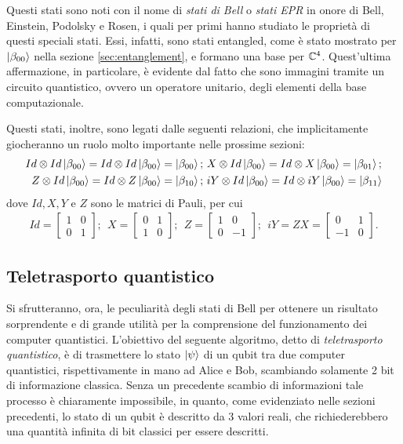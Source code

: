 Questi stati sono noti con il nome di \textit{stati di Bell} o \textit{stati EPR} in onore di Bell, Einstein, Podolsky e Rosen, i quali per primi hanno studiato le proprietà di questi speciali stati.
Essi, infatti, sono stati entangled, come è stato mostrato per $\ket{\beta_{00}}$ nella sezione \ref{sec:entanglement}, e formano una base per $\mathbb{C}^{4}$.
Quest'ultima affermazione, in particolare, è evidente dal fatto che sono immagini tramite un circuito quantistico, ovvero un operatore unitario, degli elementi della base computazionale.

Questi stati, inoltre, sono legati dalle seguenti relazioni, che implicitamente giocheranno un ruolo molto importante nelle prossime sezioni:
\begin{align}\label{eqn:Bell_identities}
 Id \otimes Id \ket{\beta_{00}} = Id \otimes Id \ket{\beta_{00}} = \ket{\beta_{00}};&\
 X \otimes Id \ket{\beta_{00}} = Id \otimes X \ket{\beta_{00}} = \ket{\beta_{01}};\\
 Z \otimes Id \ket{\beta_{00}} = Id \otimes Z \ket{\beta_{00}} = \ket{\beta_{10}};&\
 iY \otimes Id \ket{\beta_{00}} = Id \otimes iY \ket{\beta_{00}} = \ket{\beta_{11}}
\end{align}
dove $Id, X, Y$ e $Z$ sono le matrici di Pauli, per cui
\begin{align}
 Id  = 
 \begin{bmatrix}
  1 & 0\\
  0 & 1
 \end{bmatrix};\ \
 X  = 
 \begin{bmatrix}
  0 & 1\\
  1 & 0
 \end{bmatrix};\ \
 Z = 
 \begin{bmatrix}
  1 & 0\\
  0 & -1
 \end{bmatrix};\ \
 iY = ZX = 
 \begin{bmatrix}
  0 & 1\\
  -1 & 0
 \end{bmatrix}.
\end{align}


\subsection{Teletrasporto quantistico}\label{sec:QTeleportation}
Si sfrutteranno, ora, le peculiarità degli stati di Bell per ottenere un risultato sorprendente e di grande utilità per la comprensione del funzionamento dei computer quantistici. 
L'obiettivo del seguente algoritmo, detto di \textit{teletrasporto quantistico}, è di trasmettere lo stato $\ket{\psi}$ di un qubit tra due computer quantistici, rispettivamente in mano ad Alice e Bob, scambiando solamente 2 bit di informazione classica.
Senza un precedente scambio di informazioni tale processo è chiaramente impossibile, in quanto, come evidenziato nelle sezioni precedenti, lo stato di un qubit è descritto da 3 valori reali, che richiederebbero una quantità infinita di bit classici per essere descritti. 

